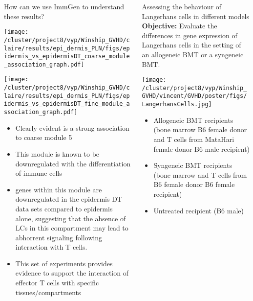 \documentclass[final,hyperref={pdfpagelabels=false}]{beamer}
\begin{document}
\begin{frame}{}
\begin{columns}[t]
\begin{column}{.36\linewidth}
\begin{block}{How can we use ImmGen to understand these results?}
  \begin{minipage}{0.45\textwidth}
    \texttt{[image: /cluster/project8/vyp/Winship\_GVHD/claire/results/epi\_dermis\_PLN/figs/epidermis\_vs\_epidermisDT\_coarse\_module\_association\_graph.pdf]}
  \end{minipage}
\hfill
\begin{minipage}{0.45\textwidth}
\texttt{[image: /cluster/project8/vyp/Winship\_GVHD/claire/results/epi\_dermis\_PLN/figs/epidermis\_vs\_epidermisDT\_fine\_module\_association\_graph.pdf]}
\end{minipage}
\hfill
{\small	  \begin{itemize}
  \item Clearly evident is a strong association to coarse module 5
  \item This module is known to be downregulated with the differentiation of immune cells
  \item genes within this module are downregulated in the epidermis DT data sets compared to epidermis alone, suggesting that the absence of LCs in this compartment may lead to abhorrent signaling following interaction with T cells. 
  \item This set of experiments provides evidence to support the interaction of effector T cells with specific tissues/compartments 
\end{itemize}}
    \end{block}
\end{column}

  \begin{column}{.36\linewidth}


    \begin{block}{Assessing the behaviour of Langerhans cells in different models}
  {\bf Objective:} Evaluate the differences in gene expression of Langerhans cells in the setting of an allogeneic BMT or a syngeneic BMT. 


  \begin{minipage}{20cm}
   \texttt{[image: /cluster/project8/vyp/Winship\_GVHD/vincent/GVHD/poster/figs/LangerhansCells.jpg]}
        \end{minipage}
  \begin{minipage}{20cm}
    \begin{itemize}
    \item Allogeneic BMT recipients (bone marrow B6 female donor and T cells from MataHari female donor B6 male recipient)
    \item Syngeneic BMT recipients (bone marrow and T cells from B6 female donor  B6 female recipient)
    \item Untreated recipient (B6 male)
    \end{itemize}
        \end{minipage}



\end{block}
\end{column}
\end{columns}
\end{frame}
\end{document}
